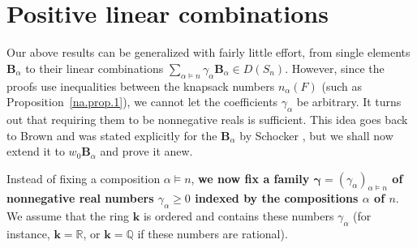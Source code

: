 \documentclass[12pt]{article}
\theoremstyle{definition}%
\theoremstyle{definition}%
\theoremstyle{remark}%
\newcommand{\tup}[1]{\left( #1 \right)}
\newcommand{\set}[1]{\left\{ #1 \right\}}
\newcommand{\QQ}{\mathbb{Q}}
\newcommand{\RR}{\mathbb{R}}
\newcommand{\kk}{\mathbf{k}}
\newcommand{\dsn}{D\left(S_n\right)}
\newcommand{\BBa}{\mathbf{B}_{\alpha}}
\newcommand{\CF}{\mathcal{F}}
\newcommand{\bgamma}{\bm{\gamma}}
\newcommand{\wo}{w_0} %
\newcommand{\na}{n_{ \alpha } }%
\newcommand{\darij}[1]{\todo[size=\small,color=cyan!30,inline]{#1 \\ \hfill --- Darij}}
\begin{document}

\section{\label{sec.pos}Positive linear combinations}


Our above results can be generalized with fairly little effort, from single elements $\BBa$ to their linear combinations $\sum_{\alpha \models n} \gamma_\alpha \BBa \in \dsn$.
However, since the proofs use inequalities between the knapsack numbers $\na\tup{F}$ (such as Proposition~\ref{na.prop.1}), we cannot let the coefficients $\gamma_\alpha$ be arbitrary.
It turns out that requiring them to be nonnegative reals is sufficient.
This idea goes back to Brown \cite[Theorem 5]{Brown-SRM} and was stated explicitly for the $\BBa$ by Schocker \cite[Theorem 4.1]{Schocker}, but we shall now extend it to $\wo\BBa$ and prove it anew.

Instead of fixing a composition $\alpha \models n$,
\textbf{we now fix a family $\bgamma = \tup{\gamma_\alpha}_{\alpha \models n}$ of nonnegative real numbers $\gamma_\alpha \geq 0$ indexed by the compositions $\alpha$ of $n$}.
We assume that the ring $\kk$ is ordered and contains these numbers $\gamma_\alpha$ (for instance, $\kk = \RR$, or $\kk = \QQ$ if these numbers are rational).
\end{document}
